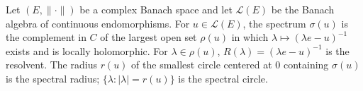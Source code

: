 Let $(E, \|\cdot\|)$ be a complex Banach space and let $\mathcal{L}(E)$ be the Banach algebra of continuous endomorphisms. For $u \in \mathcal{L}(E)$, the spectrum $\sigma(u)$ is the complement in $C$ of the largest open set $\rho(u)$ in which $\lambda \mapsto (\lambda e - u)^{-1}$ exists and is locally holomorphic. For $\lambda \in \rho(u)$, $R(\lambda) = (\lambda e - u)^{-1}$ is the resolvent. The radius $r(u)$ of the smallest circle centered at 0 containing $\sigma(u)$ is the spectral radius; $\{\lambda: |\lambda| = r(u)\}$ is the spectral circle.
